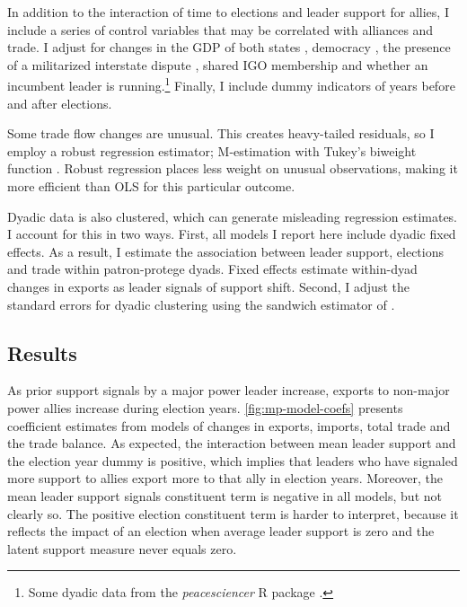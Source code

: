 \documentclass[12pt]{article}
\begin{document}
In addition to the interaction of time to elections and leader support for allies, I include a series of control variables that may be correlated with alliances and trade. 
I adjust for changes in the GDP of both states \citep{FouquinHugot2016}, democracy \citep{Marquez2016}, the presence of a militarized interstate dispute \citep{Gibleretal2016}, shared IGO membership \citep{Pevehouseetal2020} and whether an incumbent leader is running.\footnote{Some dyadic data from the \textit{peacesciencer} \textsf{R} package \citep{peacesciencer-package}.}
Finally, I include dummy indicators of years before and after elections.


Some trade flow changes are unusual. 
This creates heavy-tailed residuals, so I employ a robust regression estimator; M-estimation with Tukey's biweight function \citep{RaineyBaissa2020}.
Robust regression places less weight on unusual observations, making it more efficient than OLS for this particular outcome.


Dyadic data is also clustered, which can generate misleading regression estimates.
I account for this in two ways. 
First, all models I report here include dyadic fixed effects.
As a result, I estimate the association between leader support, elections and trade within patron-protege dyads. 
Fixed effects estimate within-dyad changes in exports as leader signals of support shift.
Second, I adjust the standard errors for dyadic clustering using the sandwich estimator of \citep{Aronowetal2015}.




\subsection{Results}


As prior support signals by a major power leader increase, exports to non-major power allies increase during election years. 
\autoref{fig:mp-model-coefs} presents coefficient estimates from models of changes in exports, imports, total trade and the trade balance. 
As expected, the interaction between mean leader support and the election year dummy is positive, which implies that leaders who have signaled more support to allies export more to that ally in election years. 
Moreover, the mean leader support signals constituent term is negative in all models, but not clearly so. 
The positive election constituent term is harder to interpret, because it reflects the impact of an election when average leader support is zero and the latent support measure never equals zero. 
\end{document}
